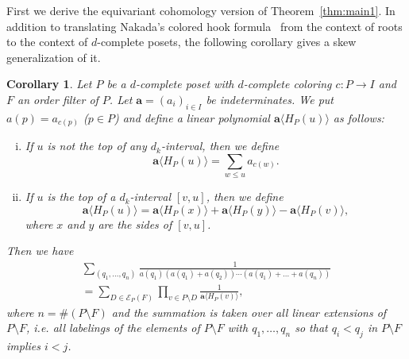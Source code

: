 \documentclass[10pt]{amsart}
\newtheorem{coro}[theo]{Corollary}
\theoremstyle{definition}
\theoremstyle{remark}
\newcommand\vecta{\boldsymbol{a}}
\newcommand\EE{\mathcal{E}}
\begin{document}
First we derive the equivariant cohomology version of Theorem~\ref{thm:main1}.
In addition to translating Nakada's colored hook formula~\cite[Corollary~7.2]{N1} 
from the context of roots to the context of $d$-complete posets, 
the following corollary gives a skew generalization of it.

\begin{coro}
\label{cor:main2}
Let $P$ be a $d$-complete poset with $d$-complete coloring $c : P \to I$ 
and $F$ an order filter of $P$.
Let $\vecta = (a_i)_{i \in I}$ be indeterminates.
We put $a(p) = a_{c(p)}$ \textup{(}$p \in P$\textup{)} 
and define a linear polynomial $\vecta \langle H_P(u) \rangle$ 
as follows:
\begin{enumerate}[(i)]
\item\label{coro5.4_i} %
If $u$ is not the top of any $d_k$-interval, then we define
$$
\vecta \langle H_P(u) \rangle = \sum_{w \le u} a_{c(w)}.
$$
\item\label{coro5.4_ii} %
If $u$ is the top of a $d_k$-interval $[v,u]$, then we define
$$
\vecta \langle H_P(u) \rangle
 =
\vecta \langle H_P(x) \rangle + \vecta \langle H_P(y) \rangle
- \vecta \langle H_P(v) \rangle,
$$
where $x$ and $y$ are the sides of $[v,u]$.
\end{enumerate}
Then we have
\begin{multline}
\label{eq:main2}
\sum_{(q_1, \dots, q_n)}
 \frac{ 1 }
 { a(q_1) (a(q_1)+a(q_2)) \cdots (a(q_1)+\dots+a(q_n)) }
\\
 =
\sum_{D \in \EE_P(F)}
 \prod_{v \in P \setminus D}
 \frac{ 1 }
 { \vecta \langle H_P(v) \rangle },
\end{multline}
where $n = \# (P\setminus F)$ and 
the summation is taken over all linear extensions of $P \setminus F$, 
i.e. all labelings of the elements of $P \setminus F$ with $q_1, \dots, q_n$ so that 
 $q_i < q_j$ in $P \setminus F$ implies $i < j$.
\end{coro}
\end{document}
